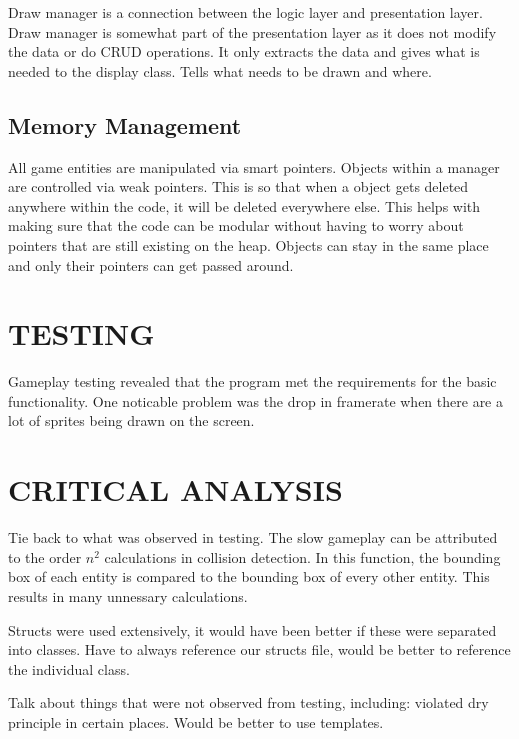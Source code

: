 \documentclass[10pt,twocolumn]{witseiepaper}
\begin{document}
Draw manager is a connection between the logic layer and presentation layer. Draw manager is somewhat part of the presentation layer as it does not modify the data or do CRUD operations. It only extracts the data and gives what is needed to the display class. Tells what needs to be drawn and where.

\subsection{Memory Management}
All game entities are manipulated via smart pointers. Objects within a manager are controlled via weak pointers. This is so that when a object gets deleted anywhere within the code, it will be deleted everywhere else. This helps with making sure that the code can be modular without having to worry about pointers that are still existing on the heap. Objects can stay in the same place and only their pointers can get passed around.



%
\section{TESTING} %
Gameplay testing revealed that the program met the requirements for the basic functionality. One noticable problem was the drop in framerate when there are a lot of sprites being drawn on the screen.

%
\section{CRITICAL ANALYSIS} %
Tie back to what was observed in testing. The slow gameplay can be attributed to the order $ n^{2} $ calculations in collision detection. In this function, the bounding box of each entity is compared to the bounding box of every other entity. This results in many unnessary calculations.

Structs were used extensively, it would have been better if these were separated into classes. Have to always reference our structs file, would be better to reference the individual class. 

Talk about things that were not observed from testing, including: violated dry principle in certain places. Would be better to use templates.
\end{document}
